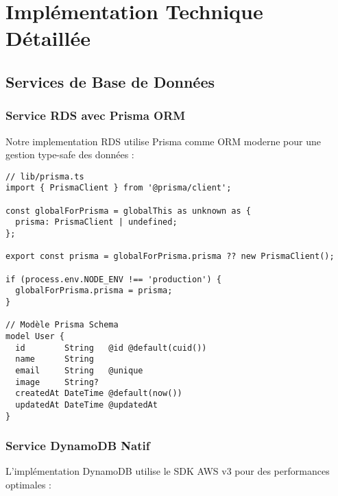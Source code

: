 \documentclass[12pt,a4paper]{report}
\begin{document}
\chapter{Implémentation Technique Détaillée}

\section{Services de Base de Données}

\subsection{Service RDS avec Prisma ORM}

Notre implementation RDS utilise Prisma comme ORM moderne pour une gestion type-safe des données :

\begin{lstlisting}[caption=Configuration Prisma pour RDS MySQL]
// lib/prisma.ts
import { PrismaClient } from '@prisma/client';

const globalForPrisma = globalThis as unknown as {
  prisma: PrismaClient | undefined;
};

export const prisma = globalForPrisma.prisma ?? new PrismaClient();

if (process.env.NODE_ENV !== 'production') {
  globalForPrisma.prisma = prisma;
}

// Modèle Prisma Schema
model User {
  id        String   @id @default(cuid())
  name      String
  email     String   @unique
  image     String?
  createdAt DateTime @default(now())
  updatedAt DateTime @updatedAt
}
\end{lstlisting}

\subsection{Service DynamoDB Natif}

L'implémentation DynamoDB utilise le SDK AWS v3 pour des performances optimales :
\end{document}
